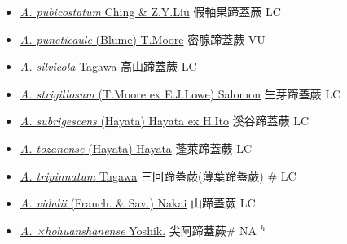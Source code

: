 \begin{itemize}
\begin{itemize}
        \item[] \href{http://www.theplantlist.org/tpl1.1/search?q=Athyrium+pubicostatum}{\textit{A. pubicostatum} Ching \& Z.Y.Liu}   假軸果蹄蓋蕨 LC
        \item[] \href{http://www.theplantlist.org/tpl1.1/search?q=Athyrium+puncticaule}{\textit{A. puncticaule} (Blume) T.Moore}   密腺蹄蓋蕨 VU
        \item[] \href{http://www.theplantlist.org/tpl1.1/search?q=Athyrium+silvicola}{\textit{A. silvicola} Tagawa}   高山蹄蓋蕨 LC
        \item[] \href{http://www.theplantlist.org/tpl1.1/search?q=Athyrium+strigillosum}{\textit{A. strigillosum} (T.Moore ex E.J.Lowe) Salomon}   生芽蹄蓋蕨 LC
        \item[] \href{http://www.theplantlist.org/tpl1.1/search?q=Athyrium+subrigescens}{\textit{A. subrigescens} (Hayata) Hayata ex H.Ito}   溪谷蹄蓋蕨 LC
        \item[] \href{http://www.theplantlist.org/tpl1.1/search?q=Athyrium+tozanense}{\textit{A. tozanense} (Hayata) Hayata}     蓬萊蹄蓋蕨 LC
        \item[] \href{http://www.theplantlist.org/tpl1.1/search?q=Athyrium+tripinnatum}{\textit{A. tripinnatum} Tagawa}     三回蹄蓋蕨(薄葉蹄蓋蕨)  \# LC
        \item[] \href{http://www.theplantlist.org/tpl1.1/search?q=Athyrium+vidalii}{\textit{A. vidalii} (Franch. \& Sav.) Nakai}   山蹄蓋蕨 LC
        \item[] \href{http://www.theplantlist.org/tpl1.1/search?q=Athyrium+×hohuanshanense}{\textit{A. ×hohuanshanense} Yoshik.}   尖阿蹄蓋蕨\# NA $^h$

\end{itemize}
\end{itemize}
